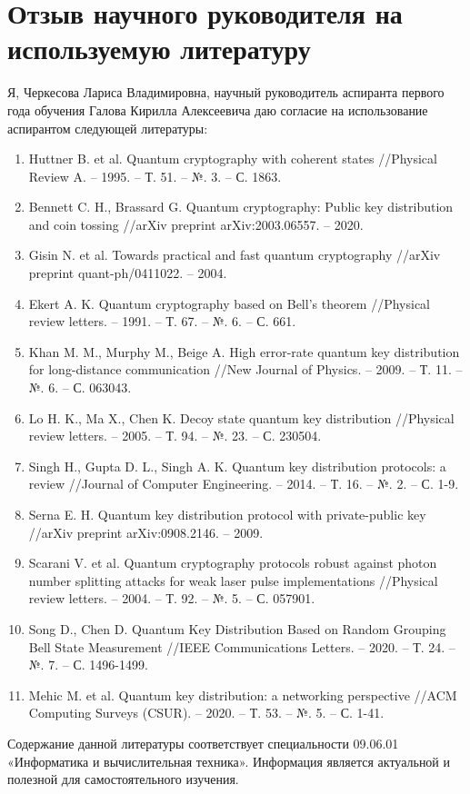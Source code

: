 \clearpage

\section*{Отзыв научного руководителя на используемую литературу}
Я, Черкесова Лариса Владимировна, научный руководитель аспиранта первого года обучения Галова Кирилла Алексеевича даю согласие на использование аспирантом следующей литературы:
\begin{enumerate}
	\item Huttner B. et al. Quantum cryptography with coherent states //Physical Review A. – 1995. – Т. 51. – №. 3. – С. 1863.
	\item Bennett C. H., Brassard G. Quantum cryptography: Public key distribution and coin tossing //arXiv preprint arXiv:2003.06557. – 2020.
	\item Gisin N. et al. Towards practical and fast quantum cryptography //arXiv preprint quant-ph/0411022. – 2004.
	\item Ekert A. K. Quantum cryptography based on Bell’s theorem //Physical review letters. – 1991. – Т. 67. – №. 6. – С. 661.
	\item Khan M. M., Murphy M., Beige A. High error-rate quantum key distribution for long-distance communication //New Journal of Physics. – 2009. – Т. 11. – №. 6. – С. 063043.
	\item Lo H. K., Ma X., Chen K. Decoy state quantum key distribution //Physical review letters. – 2005. – Т. 94. – №. 23. – С. 230504.
	\item Singh H., Gupta D. L., Singh A. K. Quantum key distribution protocols: a review //Journal of Computer Engineering. – 2014. – Т. 16. – №. 2. – С. 1-9.
	\item Serna E. H. Quantum key distribution protocol with private-public key //arXiv preprint arXiv:0908.2146. – 2009.
	\item Scarani V. et al. Quantum cryptography protocols robust against photon number splitting attacks for weak laser pulse implementations //Physical review letters. – 2004. – Т. 92. – №. 5. – С. 057901.
	\item Song D., Chen D. Quantum Key Distribution Based on Random Grouping Bell State Measurement //IEEE Communications Letters. – 2020. – Т. 24. – №. 7. – С. 1496-1499.
	\item Mehic M. et al. Quantum key distribution: a networking perspective //ACM Computing Surveys (CSUR). – 2020. – Т. 53. – №. 5. – С. 1-41.
\end{enumerate}
Содержание данной литературы соответствует специальности 09.06.01 «Информатика и вычислительная техника». Информация является актуальной и полезной для самостоятельного изучения.\\
\bigskip




